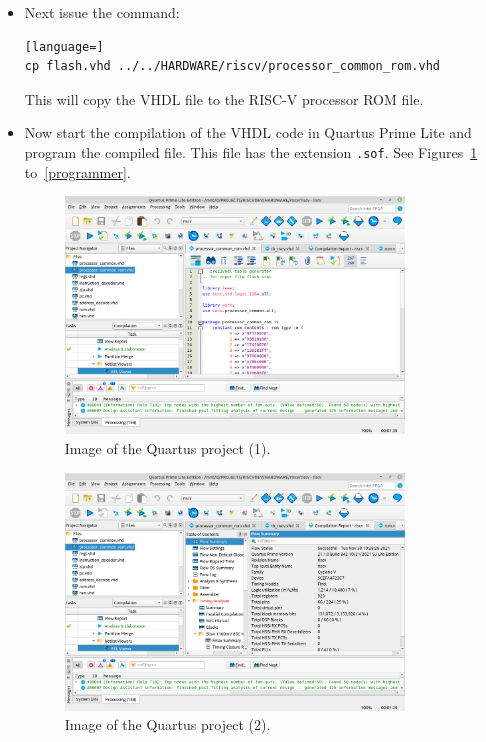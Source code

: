 \documentclass[12pt]{article}
\begin{document}
\begin{itemize}
\begin{lstlisting}[language=]
../bin/srec2vhdl -wf flash.srec flash.vhd
\end{lstlisting}
This will create a VHDL file with the ROM encoded as 32-bit Little Endian quantities. Note: the taylor-made \texttt{srec2vhdl} has to be compiled before. See Section~\ref{sec:cloning}.
\item Next issue the command:
\begin{lstlisting}[language=]
cp flash.vhd ../../HARDWARE/riscv/processor_common_rom.vhd
\end{lstlisting}
This will copy the VHDL file to the RISC-V processor ROM file.
\item Now start the compilation of the VHDL code in Quartus Prime Lite and program the compiled file. This file has the extension \lstinline|.sof|. See Figures~\ref{quartus1} to~\ref{programmer}.

\begin{figure}[!ht]
\centering
\includegraphics[width=0.85\textwidth]{quartus1}
\caption{Image of the Quartus project (1).}
\label{quartus1}
\end{figure}

\begin{figure}[!ht]
\centering
\includegraphics[width=0.85\textwidth]{quartus2}
\caption{Image of the Quartus project (2).}
\label{quartus2}
\end{figure}


\end{itemize}
\end{document}
